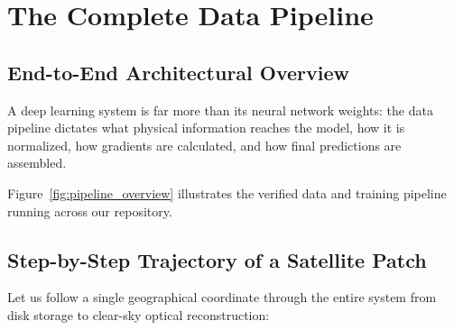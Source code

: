 \chapter{The Complete Data Pipeline}
\label{chap:ch06}

\section{End-to-End Architectural Overview}
A deep learning system is far more than its neural network weights: the data pipeline dictates what physical information reaches the model, how it is normalized, how gradients are calculated, and how final predictions are assembled.

Figure~\ref{fig:pipeline_overview} illustrates the verified data and training pipeline running across our repository.



\section{Step-by-Step Trajectory of a Satellite Patch}
Let us follow a single geographical coordinate through the entire system from disk storage to clear-sky optical reconstruction:

